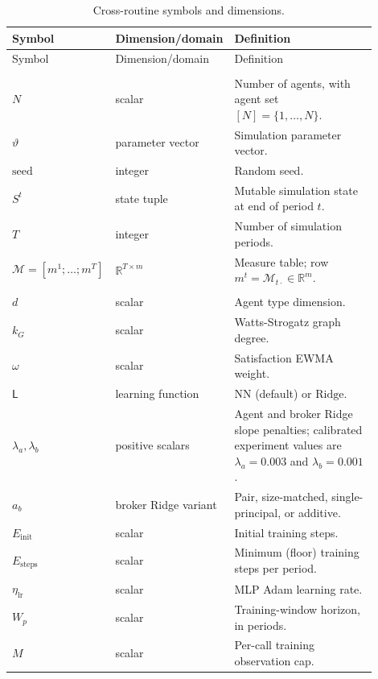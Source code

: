\documentclass[11pt]{article}
\newcommand{\diag}[1]{\textcolor{diagblue}{#1}}
\newcommand{\R}{\mathbb{R}}
\begin{document}
\begingroup
\small
\begin{longtable}{>{\raggedright\arraybackslash}p{0.20\linewidth}
                >{\raggedright\arraybackslash}p{0.22\linewidth}
                >{\raggedright\arraybackslash}p{0.48\linewidth}}
\caption{Cross-routine symbols and dimensions.}
\label{tab:notation}\\
\toprule
Symbol & Dimension/domain & Definition \\
\midrule
\endfirsthead
\toprule
Symbol & Dimension/domain & Definition \\
\midrule
\endhead
\multicolumn{3}{@{}l}{\textit{Core}}\\
$N$ & scalar & Number of agents, with agent set $[N]=\{1,\ldots,N\}$. \\
$\vartheta$ & parameter vector & Simulation parameter vector. \\
$\mathrm{seed}$ & integer & Random seed. \\
$S^t$ & state tuple & Mutable simulation state at end of period $t$. \\
$T$ & integer & Number of simulation periods. \\
\diag{$\mathcal M=[m^1;\ldots;m^T]$} & \diag{$\R^{T\times m}$} & \diag{Measure table; row $m^t=\mathcal M_{t\cdot}\in\R^m$.} \\
\addlinespace[0.25em]
\multicolumn{3}{@{}l}{\textit{Parameters}}\\
$d$ & scalar & Agent type dimension. \\
$k_G$ & scalar & Watts-Strogatz graph degree. \\
$\omega$ & scalar & Satisfaction EWMA weight. \\
$\mathsf L$ & learning function & $\mathrm{NN}$ (default) or $\mathrm{Ridge}$. \\
$\lambda_a,\lambda_b$ & positive scalars & Agent and broker Ridge slope penalties; calibrated experiment values are $\lambda_a=0.003$ and $\lambda_b=0.001$. \\
$a_b$ & broker Ridge variant & Pair, size-matched, single-principal, or additive. \\
$E_{\mathrm{init}}$ & scalar & Initial training steps. \\
$E_{\mathrm{steps}}$ & scalar & Minimum (floor) training steps per period. \\
$\eta_{\mathrm{lr}}$ & scalar & MLP Adam learning rate. \\
$W_p$ & scalar & Training-window horizon, in periods. \\
$M$ & scalar & Per-call training observation cap. \\

\end{longtable}
\end{document}
